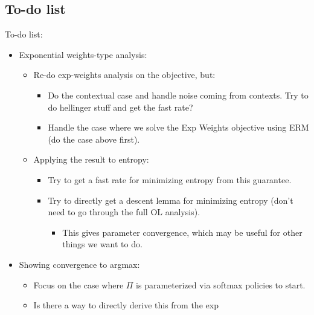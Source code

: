 \documentclass{article}
\begin{document}
\subsection{To-do list}
To-do list:
\begin{itemize}
\item Exponential weights-type analysis:
  \begin{itemize}
  \item Re-do exp-weights analysis on the objective, but:
    \begin{itemize}
    \item Do the contextual case and handle noise coming from
      contexts. Try to do hellinger stuff and get the fast rate? 
    \item Handle the case where we solve the Exp Weights objective
      using ERM (do the case above first).
    \end{itemize}
    \item Applying the result to entropy:
      \begin{itemize}
      \item Try to get a fast rate for minimizing entropy from
        this guarantee.
      \item Try to directly get a descent lemma for minimizing entropy
        (don't need to go through the full OL analysis).
        \begin{itemize}
        \item This gives parameter convergence, which may be useful
          for other things we want to do.
        \end{itemize}
    \end{itemize}
  \end{itemize}
\item Showing convergence to argmax:
  \begin{itemize}
  \item Focus on the case where $\Pi$ is parameterized via softmax
    policies to start.
  \item Is there a way to directly derive this from the exp
    

\end{itemize}
\end{itemize}
\end{document}
